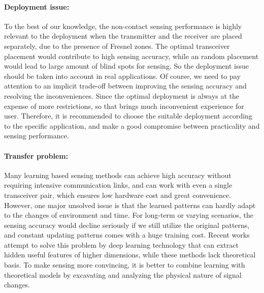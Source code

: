 \paragraph*{Deployment issue:} To the best of our knowledge, the non-contact sensing performance is highly relevant to the deployment when the transmitter and the receiver are placed separately, due to the presence of Fresnel zones. The optimal transceiver placement would contribute to high sensing accuracy, while an random placement would lead to large amount of blind spots for sensing. So the deployment issue should be taken into account in real applications. Of course, we need to pay attention to an implicit trade-off between improving the sensing accuracy and resolving the inconveniences. Since the optimal deployment is always at the expense of more restrictions, so that brings much inconvenient experience for user. Therefore, it is recommended to choose the suitable deployment according to the specific application, and make a good compromise between practicality and sensing performance.

\paragraph*{Transfer problem:} Many learning based sensing methods can achieve high accuracy without requiring intensive communication links, and can work with even a single transceiver pair, which ensures low hardware cost and great convenience. However, one major unsolved issue is that the learned patterns can hardly adapt to the changes of environment and time. For long-term or varying scenarios, the sensing accuracy would decline seriously if we still utilize the original patterns, and constant updating patterns comes with a huge training cost. Recent works attempt to solve this problem by deep learning technology that can extract hidden useful features of higher dimensions, while these methods lack theoretical basis. To make sensing more convincing, it is better to combine learning with theoretical models by excavating and analyzing the physical nature of signal changes.

